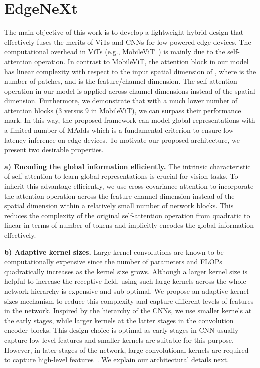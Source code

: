 \documentclass[runningheads]{llncs}
\begin{document}
\section{EdgeNeXt}




The main objective of this work is to develop a lightweight hybrid design that effectively fuses the merits of ViTs and CNNs for low-powered edge devices. The computational overhead in ViTs (e.g., MobileViT~\cite{MobileViT}) is mainly due to the self-attention operation. In contrast to MobileViT, the attention block in our model has linear complexity with respect to the input spatial dimension of , where  is the number of patches, and  is the feature/channel dimension. The self-attention operation in our model is applied across channel dimensions instead of the spatial dimension.
Furthermore, we demonstrate that with a much lower number of attention blocks (3 versus 9 in MobileViT), we can surpass their performance mark.
In this way, the proposed framework can model global representations with a limited number of MAdds which is a fundamental criterion to ensure low-latency inference on edge devices.
To motivate our proposed architecture, we present two desirable properties.

\noindent\textbf{a) Encoding the global information efficiently.} The intrinsic characteristic of self-attention to learn global representations is crucial for vision tasks. To inherit this advantage efficiently, we use cross-covariance attention to incorporate the attention operation across the feature channel dimension instead of the spatial dimension within a relatively small number of network blocks. This reduces the complexity of the original self-attention operation from quadratic to linear in terms of number of tokens and implicitly encodes the global information effectively.

\noindent\textbf{b) Adaptive kernel sizes.} Large-kernel convolutions are known to be computationally expensive since the number of parameters and FLOPs quadratically increases as the kernel size grows. Although a larger kernel size is helpful to increase the receptive field, using such large kernels across the whole network hierarchy is expensive and sub-optimal. We propose an adaptive kernel sizes mechanism to reduce this complexity and capture different levels of features in the network. Inspired by the hierarchy of the CNNs, we use smaller kernels at the early stages, while larger kernels at the latter stages in the convolution encoder blocks. This design choice is optimal as early stages in CNN usually capture low-level features and smaller kernels are suitable for this purpose. However, in later stages of the network, large convolutional kernels are required to capture high-level features~\cite{zeiler2014visualizing}. We explain our architectural details next. 
\end{document}
